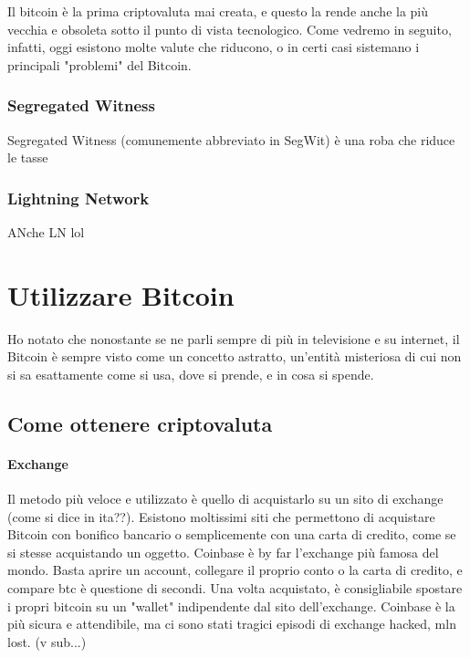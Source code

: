 \documentclass {article}
\begin{document}
Il bitcoin è la prima criptovaluta mai creata, e questo la rende anche la più vecchia e obsoleta sotto il punto di vista tecnologico. Come vedremo in seguito, infatti, oggi esistono molte valute che riducono, o in certi casi sistemano i principali "problemi" del Bitcoin.


\subsubsection {Segregated Witness}


Segregated Witness (comunemente abbreviato in SegWit) è una roba che riduce le tasse


\subsubsection {Lightning Network}


ANche LN lol


\section {Utilizzare Bitcoin}


Ho notato che nonostante se ne parli sempre di più in televisione e su internet, il Bitcoin è sempre visto come un concetto astratto, un'entità misteriosa di cui non si sa esattamente come si usa, dove si prende, e in cosa si spende.


\subsection {Come ottenere criptovaluta}


\paragraph {Exchange}


Il metodo più veloce e utilizzato è quello di acquistarlo su un sito di exchange (come si dice in ita??). Esistono moltissimi siti che permettono di acquistare Bitcoin con bonifico bancario o semplicemente con una carta di credito, come se si stesse acquistando un oggetto.
Coinbase è by far l'exchange più famosa del mondo. Basta aprire un account, collegare il proprio conto o la carta di credito, e compare btc è questione di secondi.
Una volta acquistato, è consigliabile spostare i propri bitcoin su un "wallet" indipendente dal sito dell'exchange. Coinbase è la più sicura e attendibile, ma ci sono stati tragici episodi di exchange hacked, mln lost. (v sub...)
\end{document}
